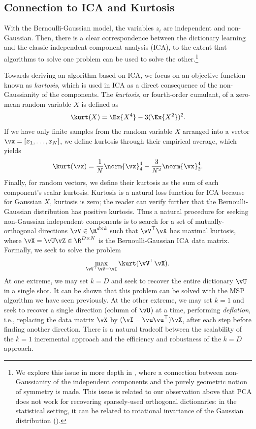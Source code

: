 \documentclass[../../book-main.tex]{subfiles}
\begin{document}
\subsection{Connection to ICA and Kurtosis}
With the Bernoulli-Gaussian model, the variables $z_i$ are independent and non-Gaussian. Then, there is a clear correspondence between the dictionary learning and the classic independent component analysis (ICA), to the extent that algorithms to solve one problem can be used to solve the other.\footnote{We explore this issue in more depth in , where a connection between non-Gaussianity of the independent components and the purely geometric notion of symmetry is made. This issue is related to our observation above that PCA does not work for recovering sparsely-used orthogonal dictionaries: in the statistical setting, it can be related to rotational invariance of the Gaussian distribution ().} 


Towards deriving an algorithm based on ICA, we focus on an objective function known as \textit{kurtosis}, which is used in ICA as a direct consequence of the non-Gaussianity of the components. The \textit{kurtosis}, or fourth-order cumulant, of a zero-mean random variable $X$ is defined as
\begin{equation}\label{eq:kurtosis}
\kurt(X) = \Ex{X^4} - 3 (\Ex{X^2})^2.
\end{equation}
If we have only finite samples from the random variable $X$ arranged into a vector $\vx = [x_1, \dots, x_N]$, we define kurtosis through their empirical average, which yields
\begin{equation}\label{eq:kurtosis-vector}
\kurt(\vx) = \frac{1}{N} \norm{\vx}_4^4 - \frac{3}{N^2} \norm{\vx}_2^4.
\end{equation}
Finally, for random vectors, we define their kurtosis as the sum of each component's scalar kurtosis.
Kurtosis is a natural loss function for ICA because for Gaussian $X$, kurtosis is zero; the reader can verify further that the Bernoulli-Gaussian distribution has positive kurtosis. 
Thus a natural procedure for seeking non-Gaussian independent components is to search for a set of mutually-orthogonal directions $\vV \in \R^{d \times k}$ such that $\vV^\top \vX$ has maximal kurtosis, where $\vX = \vU \vZ \in \R^{D \times N}$ is the Bernoulli-Gaussian ICA data matrix.
Formally, we seek to solve the problem
\begin{equation}
    \max_{\vV^\top \vV = \vI} \kurt(\vV^\top \vX).
\end{equation}
At one extreme, we may set $k = D$ and seek to recover the entire dictionary
$\vU$ in a single shot.  It can be shown that this problem can be solved with
the MSP algorithm we have seen previously. 
At the other extreme, we may set $k=1$ and seek to recover a single direction (column of $\vU$) at a time, performing \textit{deflation}, i.e., replacing the data matrix $\vX$ by $(\vI - \vu\vu^\top) \vX$, after each step before finding another direction.
There is a natural tradeoff between the scalability of the $k=1$ incremental approach and the efficiency and robustness of the $k=D$ approach. 
\end{document}
